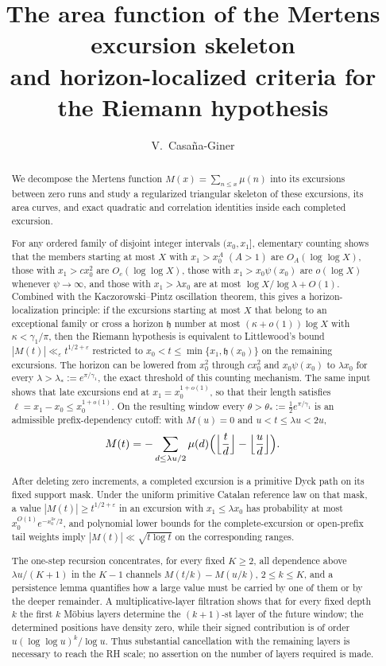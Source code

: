 \documentclass[11pt]{amsart}
\title[The Mertens excursion skeleton]{The area function of the Mertens excursion skeleton\\
and horizon-localized criteria for the Riemann hypothesis}
\author{V.~Casa\~na-Giner}
\date{}
\numberwithin{equation}{section}
\theoremstyle{plain}
\theoremstyle{definition}
\theoremstyle{remark}
\newcommand{\eps}{\varepsilon}
\begin{document}
\begin{abstract}
We decompose the Mertens function $M(x)=\sum_{n\le x}\mu(n)$ into its
excursions between zero runs and study a regularized triangular skeleton of
these excursions, its area curves, and exact quadratic and correlation
identities inside each completed excursion.

For any ordered family of disjoint integer intervals $(x_0,x_1]$, elementary
counting shows that the members starting at most $X$ with $x_1>x_0^A$
$(A>1)$ are $O_A(\log\log X)$, those with $x_1>cx_0^2$ are
$O_c(\log\log X)$, those with $x_1>x_0\psi(x_0)$ are $o(\log X)$ whenever
$\psi\to\infty$, and those with $x_1>\lambda x_0$ are at most
$\log X/\log\lambda+O(1)$. Combined with the Kaczorowski--Pintz oscillation
theorem, this gives a horizon-localization principle: if the excursions
starting at most $X$ that belong to an exceptional family or cross a horizon
$\mathfrak h$ number at most $(\kappa+o(1))\log X$ with $\kappa<\gamma_1/\pi$,
then the Riemann hypothesis is equivalent to Littlewood's bound
$|M(t)|\ll_\eps t^{1/2+\eps}$ restricted to $x_0<t\le\min\{x_1,\mathfrak h(x_0)\}$
on the remaining excursions. The horizon can be lowered from $x_0^2$ through
$cx_0^2$ and $x_0\psi(x_0)$ to $\lambda x_0$ for every
$\lambda>\lambda_*:=e^{\pi/\gamma_1}$, the exact threshold of this counting
mechanism. The same input shows that late excursions end at
$x_1=x_0^{1+o(1)}$, so that their length satisfies $\ell=x_1-x_0\le x_0^{1+o(1)}$. On the resulting window every $\theta>\theta_*:=\frac12e^{\pi/\gamma_1}$
is an admissible prefix-dependency cutoff: with $M(u)=0$ and
$u<t\le\lambda u<2u$,
\[
M(t)=-\sum_{d\le\lambda u/2}\mu(d)
\Bigl(\Bigl\lfloor\frac td\Bigr\rfloor-\Bigl\lfloor\frac ud\Bigr\rfloor\Bigr).
\]

After deleting zero increments, a completed excursion is a primitive Dyck
path on its fixed support mask. Under the uniform primitive Catalan
reference law on that mask, a value $|M(t)|\ge t^{1/2+\eps}$ in an excursion
with $x_1\le\lambda x_0$ has probability at most $x_0^{O(1)}e^{-x_0^{2\eps}/2}$,
and polynomial lower bounds for the complete-excursion or open-prefix tail
weights imply $|M(t)|\ll\sqrt{t\log t}$ on the corresponding ranges.

The one-step recursion concentrates, for every fixed $K\ge2$, all dependence
above $\lambda u/(K+1)$ in the $K-1$ channels $M(t/k)-M(u/k)$, $2\le k\le K$,
and a persistence lemma quantifies how a large value must be carried by one
of them or by the deeper remainder. A multiplicative-layer filtration shows
that for every fixed depth $k$ the first $k$ M\"obius layers determine the
$(k+1)$-st layer of the future window; the determined positions have density
zero, while their signed contribution is of order $u(\log\log u)^k/\log u$.
Thus substantial cancellation with the remaining layers is necessary to
reach the RH scale; no assertion on the number of layers required is made.


\end{abstract}
\end{document}
